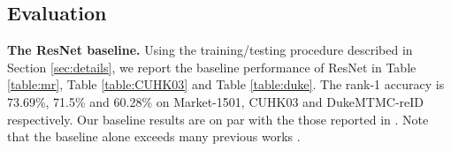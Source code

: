 \documentclass[10pt,twocolumn,letterpaper]{article}
\begin{document}
\subsection{Evaluation} \label{sec:Evaluation}
\textbf{The ResNet baseline.} Using the training/testing procedure described in Section \ref{sec:details}, we report the baseline performance of ResNet in Table \ref{table:mr}, Table \ref{table:CUHK03} and Table \ref{table:duke}. The rank-1 accuracy is 73.69\%, 71.5\% and 60.28\% on Market-1501, CUHK03 and DukeMTMC-reID respectively. Our baseline results are on par with the those reported in \cite{zheng2016survey,zheng2016discriminatively}. Note that the baseline alone exceeds many previous works \cite{liao2015person,varior2016siamese,zhang2016learning}.

\end{document}

